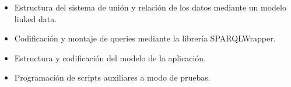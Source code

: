 \begin{itemize}
\begin{itemize}
\item Estructura del sistema de unión y relación de los datos mediante un modelo linked data.

\item Codificación y montaje de queries mediante la librería SPARQLWrapper.

\item Estructura y codificación del modelo de la aplicación.

\item Programación de scripts auxiliares a modo de pruebas.

\end{itemize}
\end{itemize}
